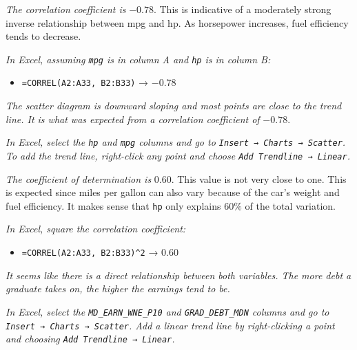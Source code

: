 \documentclass[
  11pt,
  letterpaper,
  DIV=11,
  numbers=noendperiod,
  oneside,
  open=any]{scrreprt}
\providecommand{\tightlist}{%
  \setlength{\itemsep}{0pt}\setlength{\parskip}{0pt}}\usepackage{longtable,booktabs,array}
\newenvironment{bsanswerkey}[2]{%
  \begin{tcolorbox}[bsbase, colback=bspaper2, colframe=bsline, fontupper=\small,
    title={\hypertarget{a-#1}{}\label{a-#1}\hyperlink{q-#1}{\textcolor{bsink2}{\MakeUppercase{#2}}}\hfill
      \hyperlink{q-#1}{\textcolor{bsaccent}{\normalfont\footnotesize back to page \pageref{q-#1}}}}]}%
  {\end{tcolorbox}}
\begin{document}
\begin{bsanswerkey}{bsans51}{Exercise 2, question 1}

\emph{The correlation coefficient is} \(-0.78\). This is indicative of a
moderately strong inverse relationship between mpg and hp. As horsepower
increases, fuel efficiency tends to decrease.

\emph{In Excel, assuming \texttt{mpg} is in column A and \texttt{hp} is
in column B:}

\begin{itemize}
\tightlist
\item
  \texttt{=CORREL(A2:A33,\ B2:B33)} → \(-0.78\)
\end{itemize}

\end{bsanswerkey}

\begin{bsanswerkey}{bsans52}{Exercise 2, question 2}

\emph{The scatter diagram is downward sloping and most points are close
to the trend line. It is what was expected from a correlation
coefficient of} \(-0.78\).

\emph{In Excel, select the \texttt{hp} and \texttt{mpg} columns and go
to \texttt{Insert\ →\ Charts\ →\ Scatter}. To add the trend line,
right-click any point and choose \texttt{Add\ Trendline\ →\ Linear}.}

\end{bsanswerkey}

\begin{bsanswerkey}{bsans53}{Exercise 2, question 3}

\emph{The coefficient of determination is} \(0.60\). This value is not
very close to one. This is expected since miles per gallon can also vary
because of the car's weight and fuel efficiency. It makes sense that
\texttt{hp} only explains \(60\%\) of the total variation.

\emph{In Excel, square the correlation coefficient:}

\begin{itemize}
\tightlist
\item
  \texttt{=CORREL(A2:A33,\ B2:B33)\^{}2} → \(0.60\)
\end{itemize}

\end{bsanswerkey}

\begin{bsanswerkey}{bsans54}{Exercise 3, question 1}

\emph{It seems like there is a direct relationship between both
variables. The more debt a graduate takes on, the higher the earnings
tend to be.}

\emph{In Excel, select the \texttt{MD\_EARN\_WNE\_P10} and
\texttt{GRAD\_DEBT\_MDN} columns and go to
\texttt{Insert\ →\ Charts\ →\ Scatter}. Add a linear trend line by
right-clicking a point and choosing \texttt{Add\ Trendline\ →\ Linear}.}

\end{bsanswerkey}
\end{document}
